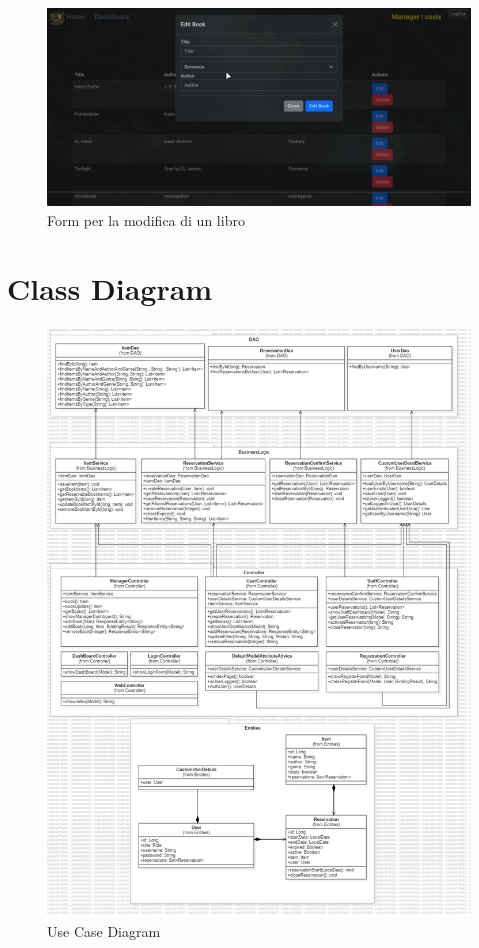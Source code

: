 \documentclass[twoside,openright,titlepage,fleqn,headinclude,12pt,a4paper,BCOR=5mm,footinclude]{scrbook}
\begin{document}
\begin{figure}[H]
  \centering
  \includegraphics[width=0.9\linewidth]{images/EditBook.png}
  \caption{Form per la modifica di un libro}
  \label{fig:Form per la modifica di un libro}
\end{figure}

\section{Class Diagram}


\begin{figure}[H]
  \centering
  \includegraphics[width=1\linewidth]{images/classDiag.jpg}
  \caption{Use Case Diagram}
  \label{fig:Use Case Diagram}
\end{figure}
\end{document}
